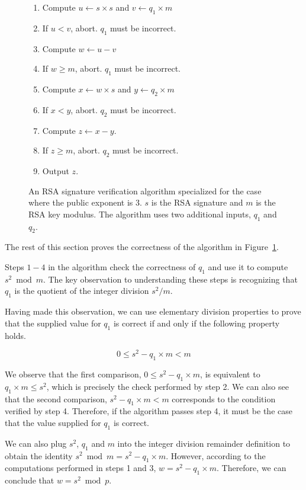 \begin{figure}[hbt]
  \begin{enumerate}
    \item Compute $u \leftarrow s \times s$ and $v \leftarrow q_1 \times m$
    \item If $u < v$, abort. $q_1$ must be incorrect.
    \item Compute $w \leftarrow u - v$
    \item If $w \ge m$, abort. $q_1$ must be incorrect.
    \item Compute $x \leftarrow w \times s$ and $y \leftarrow q_2 \times m$
    \item If $x < y$, abort. $q_2$ must be incorrect.
    \item Compute $z \leftarrow x - y$.
    \item If $z \ge m$, abort. $q_2$ must be incorrect.
    \item Output $z$.
  \end{enumerate}
  \caption{
    An RSA signature verification algorithm specialized for the case where
    the public exponent is 3. $s$ is the RSA signature and $m$ is the RSA key
    modulus. The algorithm uses two additional inputs, $q_1$ and $q_2$.
  }
  \label{fig:sgx_sig_verification}
\end{figure}

The rest of this section proves the correctness of the algorithm in
Figure~\ref{fig:sgx_sig_verification}.



Steps $1 - 4$ in the algorithm check the correctness of $q_1$ and use it
to compute $s^2 \bmod m$. The key observation to understanding these steps is
recognizing that $q_1$ is the quotient of the integer division $s^2 / m$.

Having made this observation, we can use elementary division properties to
prove that the supplied value for $q_1$ is correct if and only if the following
property holds.

$$ 0 \le s^2 - q_1 \times m < m $$

We observe that the first comparison, $0 \le s^2 - q_1 \times m$, is equivalent
to $q_1 \times m \le s^2$, which is precisely the check performed by step 2. We
can also see that the second comparison, $s^2 - q_1 \times m < m$ corresponds
to the condition verified by step 4. Therefore, if the algorithm passes step 4,
it must be the case that the value supplied for $q_1$ is correct.

We can also plug $s^2$, $q_1$ and $m$ into the integer division remainder
definition to obtain the identity $s^2 \bmod m = s^2 - q_1 \times m$. However,
according to the computations performed in steps 1 and 3,
$w = s^2 - q_1 \times m$. Therefore, we can conclude that $w = s^2 \bmod p$.


